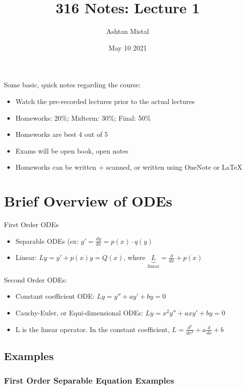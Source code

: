 \documentclass{article}
\title{316 Notes: Lecture 1}
\author{Ashtan Mistal}
\date{May 10 2021}
\begin{document}
\maketitle


Some basic, quick notes regarding the course:

\begin{itemize}
    \item Watch the pre-recorded lectures prior to the actual lectures
    \item Homeworks: 20\%; Midterm: 30\%; Final: 50\%
    \item Homeworks are best 4 out of 5
    \item Exams will be open book, open notes
    \item Homeworks can be written + scanned, or written using OneNote or \LaTeX
\end{itemize}

\section{Brief Overview of ODEs}

First Order ODEs

\begin{itemize}
    \item Separable ODEs (ex: $y' = \frac{dy}{dx} = p(x) \cdot q(y)$
    \item Linear: $Ly = y' + p(x) y = Q(x)$, where $\underbrace{L}_{\text{linear}} = \frac{d}{dx} + p(x)$
\end{itemize}

Second Order ODEs:

\begin{itemize}
    \item Constant coefficient ODE: $Ly = y'' + a y' + by = 0$
    \item Cauchy-Euler, or Equi-dimensional ODEs: $Ly = x^2 y'' + a x y' + by = 0$
    \item L is the linear operator. In the constant coefficient, $L = \frac{d^2}{dx^2} + a \frac{d}{dx} + b$
\end{itemize}

\subsection{Examples}
\subsubsection{First Order Separable Equation Examples}
\end{document}
